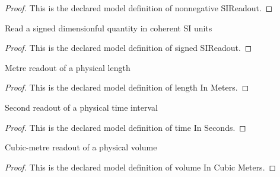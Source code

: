 \begin{proof}
  This is the declared model definition of nonnegative SIReadout.
\end{proof}
\begin{definition}
  \label{def:physics:phyx-mini-0234:phyxminiproblems-problemphyxmini0234-signedsireadout}
  Read a signed dimensionful quantity in coherent SI units
\end{definition}
\begin{proof}
  This is the declared model definition of signed SIReadout.
\end{proof}
\begin{definition}
  \label{def:physics:phyx-mini-0234:phyxminiproblems-problemphyxmini0234-lengthinmeters}
  Metre readout of a physical length
\end{definition}
\begin{proof}
  This is the declared model definition of length In Meters.
\end{proof}
\begin{definition}
  \label{def:physics:phyx-mini-0234:phyxminiproblems-problemphyxmini0234-timeinseconds}
  Second readout of a physical time interval
\end{definition}
\begin{proof}
  This is the declared model definition of time In Seconds.
\end{proof}
\begin{definition}
  \label{def:physics:phyx-mini-0234:phyxminiproblems-problemphyxmini0234-volumeincubicmeters}
  Cubic-metre readout of a physical volume
\end{definition}
\begin{proof}
  This is the declared model definition of volume In Cubic Meters.
\end{proof}
